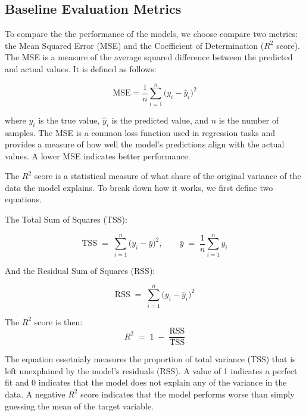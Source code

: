 \documentclass[twoside]{ctuthesis}
\theoremstyle{plain}
\theoremstyle{definition}
\theoremstyle{note}
\begin{document}
\subsection{Baseline Evaluation Metrics}

To compare the the performance of the models, we choose compare two metrics: the Mean Squared Error (MSE) and the Coefficient of Determination ($R^2$ score). The MSE is a measure of the average squared difference between the predicted and actual values. It is defined as follows:\par

\begin{equation}
	\mathrm{MSE} = \frac{1}{n}\sum_{i=1}^{n}\bigl(y_i - \hat{y}_i\bigr)^2
\end{equation}

where $y_i$ is the true value, $\hat{y}_i$ is the predicted value, and $n$ is the number of samples. The MSE is a common loss function used in regression tasks and provides a measure of how well the model's predictions align with the actual values. A lower MSE indicates better performance.\par

The $R^2$ score is a statistical measure of what share of the original variance of the data the model explains. To break down how it works, we first define two equations.\par
The Total Sum of Squares (TSS):\par
\begin{equation}
	\mathrm{TSS} \;=\; \sum_{i=1}^{n} \bigl(y_i - \bar{y}\bigr)^2,
	\qquad
	\bar{y} \;=\; \frac{1}{n}\sum_{i=1}^{n} y_i
\end{equation}


And the Residual Sum of Squares (RSS):\par
\begin{equation}
	\mathrm{RSS} \;=\; \sum_{i=1}^{n} \bigl(y_i - \hat{y}_i\bigr)^2
\end{equation}

The $R^2$ score is then:
\begin{equation}
	R^{2} \;=\; 1 \;-\; \frac{\mathrm{RSS}}{\mathrm{TSS}}
\end{equation}

The equation essetnialy measures the proportion of total variance (TSS) that is left unexplained by the model's residuals (RSS).  A value of 1 indicates a perfect fit and 0 indicates that the model does not explain any of the variance in the data. A negative $R^2$ score indicates that the model performs worse than simply guessing the mean of the target variable.\par
\end{document}
